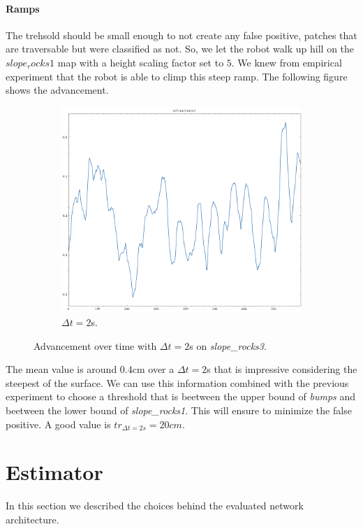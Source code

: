 \documentclass[../document.tex]{subfiles}
\begin{document}
\paragraph{Ramps}
The trehsold should be small enough to not create any false positive, patches that are traversable but were classified as not. So, we let the robot walk up hill on the $slope_rocks1$ map with a height scaling factor set to $5$. We knew from empirical experiment that the robot is able to climp this steep ramp. The following figure shows the advancement.
\begin{figure}[htbp]
    \centering
    \begin{subfigure}[b]{0.45\textwidth}
        \includegraphics[width=\linewidth]{../img/3/find_tr/100-slope_rocks1}
        \caption{$\Delta t = 2$s.}
    \end{subfigure}
    
    \caption{Advancement over time with $\Delta t = 2$s on \emph{slope\_rocks3}.}
\end{figure}
The mean value is around $0.4$cm over a $\Delta t =2$s that is impressive considering the steepest of the surface. We can use this information combined with the previous experiment to choose a threshold that is beetween the upper bound of \emph{bumps} and beetween the lower bound of \emph{slope\_rocks1}. This will ensure to minimize the false positive. A good value is $tr_{\Delta t = 2s} = 20cm$. 

\section{Estimator}
\label{sec: estimator}
In this section we described the choices behind the evaluated network architecture.
\end{document}
